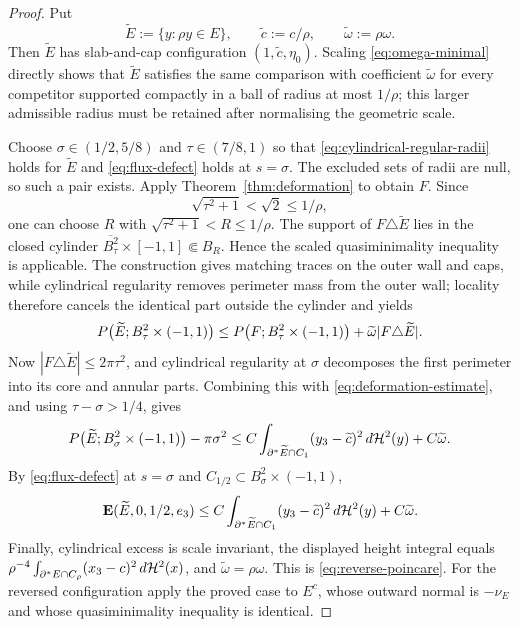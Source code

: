 \begin{proof}
Put
\[
 \widetilde E:=\{y:\rho y\in E\},\qquad
 \widetilde c:=c/\rho,\qquad \widetilde\omega:=\rho\omega.
\]
Then $\widetilde E$ has slab-and-cap configuration
$(1,\widetilde c,\eta_0)$.  Scaling \eqref{eq:omega-minimal} directly shows
that $\widetilde E$ satisfies the same comparison with coefficient
$\widetilde\omega$ for every competitor supported compactly in a ball of
radius at most $1/\rho$; this larger admissible radius must be retained after
normalising the geometric scale.

Choose
$\sigma\in(1/2,5/8)$ and $\tau\in(7/8,1)$ so that
\eqref{eq:cylindrical-regular-radii} holds for $\widetilde E$ and
\eqref{eq:flux-defect} holds at $s=\sigma$.  The excluded sets of radii are
null, so such a pair exists.  Apply Theorem~\ref{thm:deformation} to obtain
$F$.  Since
\[
 \sqrt{\tau^2+1}<\sqrt2\le1/\rho,
\]
one can choose $R$ with
$\sqrt{\tau^2+1}<R\le1/\rho$.  The support of
$F\triangle\widetilde E$ lies in the closed cylinder
$\overline{B_\tau^2}\times[-1,1]\Subset B_R$.  Hence the scaled
quasiminimality inequality is applicable.  The construction gives matching
traces on the outer wall and caps, while cylindrical regularity removes
perimeter mass from the outer wall; locality therefore cancels the identical
part outside the cylinder and yields
\[
 P\bigl(\widetilde E;B_\tau^2\times(-1,1)\bigr)
 \le P\bigl(F;B_\tau^2\times(-1,1)\bigr)
     +\widetilde\omega|F\triangle\widetilde E|.
\]
Now $|F\triangle\widetilde E|\le2\pi\tau^2$, and cylindrical regularity at
$\sigma$ decomposes the first perimeter into its core and annular parts.
Combining this with \eqref{eq:deformation-estimate}, and using
$\tau-\sigma>1/4$, gives
\begin{equation}\label{eq:reverse-unit}
  P\bigl(\widetilde E;B_\sigma^2\times(-1,1)\bigr)-\pi\sigma^2
  \le C\int_{\partial^*{\widetilde E}\cap C_1}
                 (y_3-\widetilde c)^2\,d\mathcal H^2(y)
       +C\widetilde\omega .
\end{equation}
By \eqref{eq:flux-defect} at $s=\sigma$ and
$C_{1/2}\subset B_\sigma^2\times(-1,1)$,
\[
 \operatorname{\mathbf E}(\widetilde E,0,1/2,e_3)
 \le C\int_{\partial^*{\widetilde E}\cap C_1}
              (y_3-\widetilde c)^2\,d\mathcal H^2(y)
      +C\widetilde\omega .
\]
Finally, cylindrical excess is scale invariant, the displayed height
integral equals
$\rho^{-4}\int_{\partial^* E\cap C_\rho}(x_3-c)^2\,d\mathcal H^2(x)$, and
$\widetilde\omega=\rho\omega$.  This is \eqref{eq:reverse-poincare}.
For the reversed configuration apply the proved case to $E^c$, whose outward
normal is $-\nu_E$ and whose quasiminimality inequality is identical.
\end{proof}

